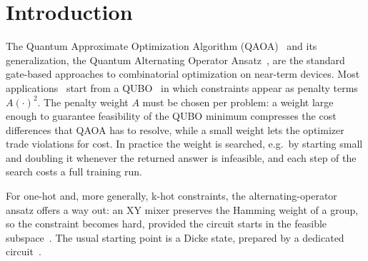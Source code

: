 \documentclass{article}
\begin{document}
\section{Introduction}
\label{sec:intro}
The Quantum Approximate Optimization Algorithm (QAOA)~\cite{farhi2014quantumapproximateoptimizationalgorithm} and its generalization, the Quantum Alternating Operator Ansatz~\cite{Hadfield_2019}, are the standard gate-based approaches to combinatorial optimization on near-term devices.
Most applications~\cite{Suksmono_2022,niroula2022constrained,Tabi_2020} start from a QUBO~\cite{lucas2014ising} in which constraints appear as penalty terms $A(\cdot)^2$.
The penalty weight $A$ must be chosen per problem: a weight large enough to guarantee feasibility of the QUBO minimum compresses the cost differences that QAOA has to resolve, while a small weight lets the optimizer trade violations for cost.
In practice the weight is searched, e.g.\ by starting small and doubling it whenever the returned answer is infeasible, and each step of the search costs a full training run.

For one-hot and, more generally, k-hot constraints, the alternating-operator ansatz offers a way out: an XY mixer preserves the Hamming weight of a group, so the constraint becomes hard, provided the circuit starts in the feasible subspace~\cite{Hadfield_2019,wang2020xy}.
The usual starting point is a Dicke state, prepared by a dedicated circuit~\cite{B_rtschi_2019,baertschi2022short}.
\end{document}
